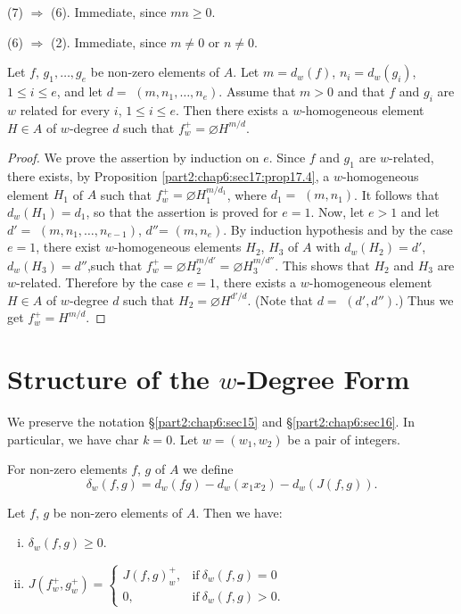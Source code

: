 (7) $\Rightarrow$ (6). Immediate, since $mn \geq 0$.

(6) $\Rightarrow$ (2). Immediate, since $m \neq 0$ or $n \neq 0$.

\begin{coro}\label{part2:chap6:sec17:coro17.5}
  Let $f$, $g_1, \ldots, g_e$ be non-zero elements of $A$. Let $m= d_w
  (f)$, $n_i =d_w (g_i)$, $1 \leq i \leq e$, and let $d=$ \gcd $(m,
  n_1 , \ldots , n_e)$. Assume that $m>0$ and that $f$ and $g_i$ are
  $w$ related for every $i$, $1 \leq i \leq e$. Then there exists a
  $w$-homogeneous element $H \in A$ of $w$-degree $d$ such that
  $f^+_w= \diameter H^{m/d}$.
\end{coro}

\begin{proof}
  We prove the assertion by induction on $e$. Since $f$ and $g_1$ are
  $w$-related, there exists, by Proposition
  \ref{part2:chap6:sec17:prop17.4}, a $w$-homogeneous element $H_1$ of
  $A$ such that $f_w^+ = \diameter H_1^{m/d_1}$, where $d_1 =$ \gcd
  $(m, n_1)$. It follows that $d_w (H_1)= d_1$, so that the assertion
  is proved for $e=1$. Now, let $e>1$ and let $d'=$ \gcd $(m, n_1,
  \ldots , n_{e-1})$, $d''$= \gcd $(m, n_e)$. By induction hypothesis
  and by the case $e=1$, there exist $w$-homogeneous elements $H_2$,
  $H_3$ of $A$ with $d_w (H_2)= d'$, $d_w (H_3)= d''$,\pageoriginale such that
  $f_w^+= \diameter H_2^{m/d'}= \diameter H_3^{m/d''}$. This shows
  that $H_2$ and $H_3$ are $w$-related. Therefore by the case $e=1$, there
  exists a $w$-homogeneous element $H \in A$ of $w$-degree $d$ such
  that $H_2= \diameter H^{d'/d}$. (Note that $d=$ \gcd $(d', d'')$.)
  Thus we get $f_w^+= H^{m/d}$.
\end{proof}

\section{Structure of the $w$-Degree Form}\label{part2:chap6:sec18}

We preserve the notation \S \ref{part2:chap6:sec15} and
\S \ref{part2:chap6:sec16}. In particular, we have char $k=0$. Let $w=
(w_1, w_2)$ be a pair of integers. 

\begin{defi}\label{part2:chap6:sec18:def18.1}
  For non-zero elements $f$, $g$ of $A$ we define
  $$
  \delta_w (f, g) = d_w (fg) - d_w (x_1 x_2)-d_w (J (f, g)).
  $$
\end{defi}

\begin{lemma}\label{part2:chap6:sec18:lem18.2}
  Let $f$, $g$ be non-zero elements of $A$. Then we have:
  \begin{enumerate}[(i)]
    \item $\delta_w (f, g)\geq 0$.
      \item $J(f_w^+, g_w^+) = \begin{cases} 
        J(f, g)_w^+, & \text{if}~ \delta_w (f, g) =0\\
        0, & \text{if}~ \delta_w (f, g)> 0.
      \end{cases}$
  \end{enumerate}
\end{lemma}

